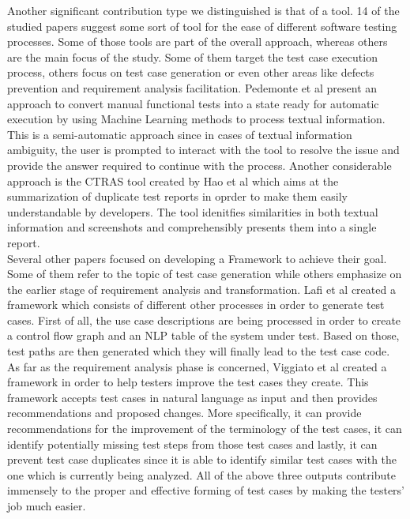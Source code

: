 Another significant contribution type we distinguished is that of a tool. 14 of the studied papers suggest some sort of tool for the ease of different software testing processes. 
Some of those tools are part of the overall approach, whereas others are the main focus of the study. Some of them target the test case execution process, others focus on test case 
generation or even other areas like defects prevention and requirement analysis facilitation. Pedemonte et al \cite{pedemonte2012towards} present an approach to convert manual 
functional tests into a state ready for automatic execution by using Machine Learning methods to process textual information. This is a semi-automatic approach since in cases 
of textual information ambiguity, the user is prompted to interact with the tool to resolve the issue and provide the answer required to continue with the process. Another 
considerable approach is the CTRAS tool created by Hao et al \cite{8811987} which aims at the summarization of duplicate test reports in oprder to make them easily understandable 
by developers. The tool idenitfies similarities in both textual information and screenshots and comprehensibly presents them into a single report. \\

Several other papers focused on developing a Framework to achieve their goal. Some of them refer to the topic of test case generation while others 
emphasize on the earlier stage of requirement analysis and transformation. Lafi et al \cite{9491761} created a framework which consists of different other 
processes in order to generate test cases. First of all, the use case descriptions are being processed in order to create a control flow graph and an NLP table of the 
system under test. Based on those, test paths are then generated which they will finally lead to the test case code. As far as the requirement analysis phase 
is concerned, Viggiato et al \cite{viggiato2022using} created a framework in order to help testers improve the test cases they create. This framework 
accepts test cases in natural language as input and then provides recommendations and proposed changes. More specifically, it can provide recommendations 
for the improvement of the terminology of the test cases, it can identify potentially missing test steps from those test cases and lastly, it can 
prevent test case duplicates since it is able to identify similar test cases with the one which is currently being analyzed. All of the above three 
outputs contribute immensely to the proper and effective forming of test cases by making the testers' job much easier. \\

